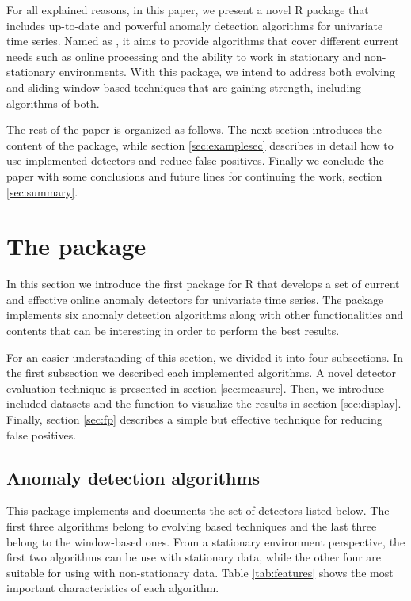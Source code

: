 \documentclass[a4paper]{article}
\begin{document}
For all explained reasons, in this paper, we present a novel R package that includes up-to-date and powerful anomaly detection algorithms for univariate time series. Named as , it aims to provide algorithms that cover different current needs such as online processing and the ability to work in stationary and non-stationary environments. With this package, we intend to address both evolving and sliding window-based techniques that are gaining strength, including algorithms of both.

The rest of the paper is organized as follows. The next section introduces the content of the  package, while section \ref{sec:examplesec} describes in detail how to use implemented detectors and reduce false positives. Finally we conclude the paper with some conclusions and future lines for continuing the work, section \ref{sec:summary}.

\section{The  package}\label{sec:package}

In this section we introduce the first package for R that develops a set of current and effective online anomaly detectors for univariate time series. The  package implements six anomaly detection algorithms along with other functionalities and contents that can be interesting in order to perform the best results.

For an easier understanding of this section, we divided it into four subsections. In the first subsection we described each implemented algorithms. A novel detector evaluation technique is presented in section \ref{sec:measure}. Then, we introduce included datasets and the function to visualize the results in section \ref{sec:display}. Finally, section \ref{sec:fp} describes a simple but effective technique for reducing false positives.

\subsection{Anomaly detection algorithms} \label{sec:detectors}

This package implements and documents the set of detectors listed below. The first three algorithms belong to evolving based techniques and the last three belong to the window-based ones. From a stationary environment perspective, the first two algorithms can be use with stationary data, while the other four are suitable for using with non-stationary data. Table \ref{tab:features} shows the most important characteristics of each algorithm.
\end{document}
